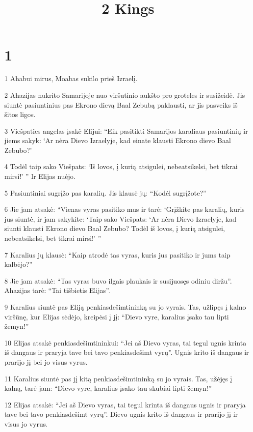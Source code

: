 

\title{
\par 2 Kings}

\chapter{1}

\par 1 Ahabui mirus, Moabas sukilo prieš Izraelį. 
\par 2 Ahazijas nukrito Samarijoje nuo viršutinio aukšto pro groteles ir susižeidė. Jis siuntė pasiuntinius pas Ekrono dievą Baal Zebubą paklausti, ar jis pasveiks iš šitos ligos. 
\par 3 Viešpaties angelas įsakė Elijui: “Eik pasitikti Samarijos karaliaus pasiuntinių ir jiems sakyk: ‘Ar nėra Dievo Izraelyje, kad einate klausti Ekrono dievo Baal Zebubo?’ 
\par 4 Todėl taip sako Viešpats: ‘Iš lovos, į kurią atsigulei, nebeatsikelsi, bet tikrai mirsi!’ ” Ir Elijas nuėjo. 
\par 5 Pasiuntiniai sugrįžo pas karalių. Jis klausė jų: “Kodėl sugrįžote?” 
\par 6 Jie jam atsakė: “Vienas vyras pasitiko mus ir tarė: ‘Grįžkite pas karalių, kuris jus siuntė, ir jam sakykite: ‘Taip sako Viešpats: ‘Ar nėra Dievo Izraelyje, kad siunti klausti Ekrono dievo Baal Zebubo? Todėl iš lovos, į kurią atsigulei, nebeatsikelsi, bet tikrai mirsi!’ ” 
\par 7 Karalius jų klausė: “Kaip atrodė tas vyras, kuris jus pasitiko ir jums taip kalbėjo?” 
\par 8 Jie jam atsakė: “Tas vyras buvo ilgais plaukais ir susijuosęs odiniu diržu”. Ahazijas tarė: “Tai tišbietis Elijas”. 
\par 9 Karalius siuntė pas Eliją penkiasdešimtininką su jo vyrais. Tas, užlipęs į kalno viršūnę, kur Elijas sėdėjo, kreipėsi į jį: “Dievo vyre, karalius įsako tau lipti žemyn!” 
\par 10 Elijas atsakė penkiasdešimtininkui: “Jei aš Dievo vyras, tai tegul ugnis krinta iš dangaus ir praryja tave bei tavo penkiasdešimt vyrų”. Ugnis krito iš dangaus ir prarijo jį bei jo visus vyrus. 
\par 11 Karalius siuntė pas jį kitą penkiasdešimtininką su jo vyrais. Tas, užėjęs į kalną, tarė jam: “Dievo vyre, karalius įsako tau skubiai lipti žemyn!” 
\par 12 Elijas atsakė: “Jei aš Dievo vyras, tai tegul krinta iš dangaus ugnis ir praryja tave bei tavo penkiasdešimt vyrų”. Dievo ugnis krito iš dangaus ir prarijo jį ir visus jo vyrus. 
